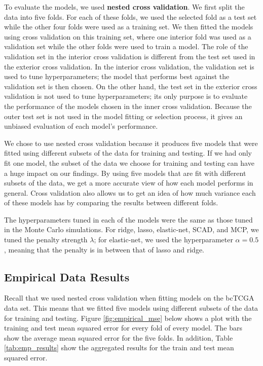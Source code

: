 \documentclass{article}
\begin{document}
To evaluate the models, we used \textbf{nested cross validation}. We first split the data into five folds. For each of these folds, we used the selected fold as a test set while the other four folds were used as a training set. We then fitted the models using cross validation on this training set, where one interior fold was used as a validation set while the other folds were used to train a model. The role of the validation set in the interior cross validation is different from the test set used in the exterior cross validation. In the interior cross validation, the validation set is used to tune hyperparameters; the model that performs best against the validation set is then chosen. On the other hand, the test set in the exterior cross validation is not used to tune hyperparameters; its only purpose is to evaluate the performance of the models chosen in the inner cross validation. Because the outer test set is not used in the model fitting or selection process, it gives an unbiased evaluation of each model's performance.

We chose to use nested cross validation because it produces five models that were fitted using different subsets of the data for training and testing. If we had only fit one model, the subset of the data we choose for training and testing can have a huge impact on our findings. By using five models that are fit with different subsets of the data, we get a more accurate view of how each model performs in general. Cross validation also allows us to get an idea of how much variance each of these models has by comparing the results between different folds.

The hyperparameters tuned in each of the models were the same as those tuned in the Monte Carlo simulations. For ridge, lasso, elastic-net, SCAD, and MCP, we tuned the penalty strength $\lambda$; for elastic-net, we used the hyperparameter $\alpha = 0.5$, meaning that the penalty is in between that of lasso and ridge. 

\subsection{Empirical Data Results}
Recall that we used nested cross validation when fitting models on the bcTCGA data set. This means that we fitted five models using different subsets of the data for training and testing. Figure \ref{fig:empirical_mse} below shows a plot with the training and test mean squared error for every fold of every model. The bars show the average mean squared error for the five folds. In addition, Table \ref{tab:emp_results} show the aggregated results for the train and test mean squared error.
\end{document}
